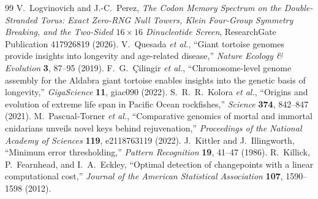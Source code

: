 \documentclass[11pt,a4paper]{article}
\renewcommand{\_}{\origunderscore\penalty200\relax}
\theoremstyle{remark}
\begin{document}
\begin{thebibliography}{99}
 V.~Logvinovich and J.-C.~Perez, \textit{The Codon Memory Spectrum on the Double-Stranded Torus: Exact Zero-RNG Null Towers, Klein Four-Group Symmetry Breaking, and the Two-Sided $16\times 16$ Dinucleotide Screen}, ResearchGate Publication 417926819 (2026).
 V.~Quesada \textit{et al.}, ``Giant tortoise genomes provide insights into longevity and age-related disease,'' \textit{Nature Ecology \& Evolution} \textbf{3}, 87--95 (2019).
 F.~G.~\c{C}ilingir \textit{et al.}, ``Chromosome-level genome assembly for the Aldabra giant tortoise enables insights into the genetic basis of longevity,'' \textit{GigaScience} \textbf{11}, giac090 (2022).
 S.~R.~R.~Kolora \textit{et al.}, ``Origins and evolution of extreme life span in Pacific Ocean rockfishes,'' \textit{Science} \textbf{374}, 842--847 (2021).
 M.~Pascual-Torner \textit{et al.}, ``Comparative genomics of mortal and immortal cnidarians unveils novel keys behind rejuvenation,'' \textit{Proceedings of the National Academy of Sciences} \textbf{119}, e2118763119 (2022).
 J.~Kittler and J.~Illingworth, ``Minimum error thresholding,'' \textit{Pattern Recognition} \textbf{19}, 41--47 (1986).
 R.~Killick, P.~Fearnhead, and I.~A.~Eckley, ``Optimal detection of changepoints with a linear computational cost,'' \textit{Journal of the American Statistical Association} \textbf{107}, 1590--1598 (2012).
\end{thebibliography}
\end{document}
